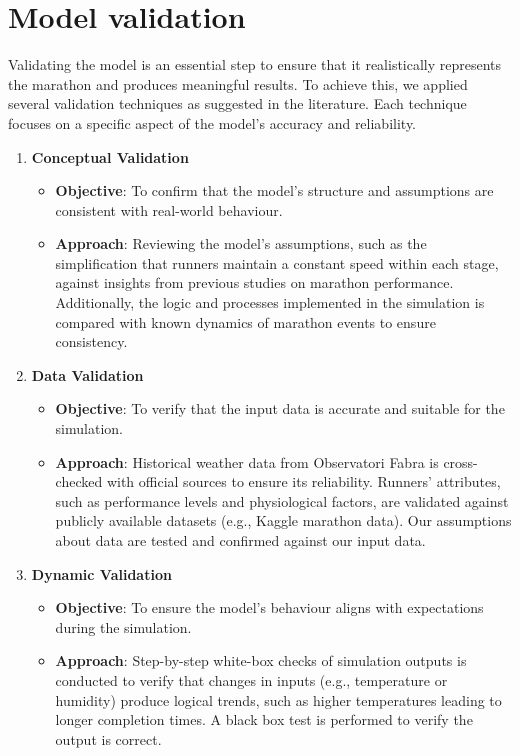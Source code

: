 \documentclass[conference]{IEEEtran}
\begin{document}
\section{Model validation}
Validating the model is an essential step to ensure that it realistically represents the marathon and produces meaningful results. To achieve this, we applied several validation techniques as suggested in the literature. Each technique focuses on a specific aspect of the model’s accuracy and reliability.
\begin{enumerate}
    \item \textbf{Conceptual Validation}
    \begin{itemize}
        \item \textbf{Objective}: To confirm that the model’s structure and assumptions are consistent with real-world behaviour.
        \item \textbf{Approach}: Reviewing the model’s assumptions, such as the simplification that runners maintain a constant speed within each stage, against insights from previous studies on marathon performance. Additionally, the logic and processes implemented in the simulation is compared with known dynamics of marathon events to ensure consistency.
    \end{itemize}
    \item \textbf{Data Validation}
        \begin{itemize}
        \item \textbf{Objective}: To verify that the input data is accurate and suitable for the simulation.
        \item \textbf{Approach}: Historical weather data from Observatori Fabra is cross-checked with official sources to ensure its reliability. Runners’ attributes, such as performance levels and physiological factors, are validated against publicly available datasets (e.g., Kaggle marathon data). Our assumptions about data are tested and confirmed against our input data.
    \end{itemize}
    \item \textbf{Dynamic Validation}
        \begin{itemize}
        \item \textbf{Objective}: To ensure the model’s behaviour aligns with expectations during the simulation.
        \item \textbf{Approach}: Step-by-step white-box checks of simulation outputs is conducted to verify that changes in inputs (e.g., temperature or humidity) produce logical trends, such as higher temperatures leading to longer completion times. A black box test is performed to verify the output is correct.

\end{itemize}
\end{enumerate}
\end{document}
